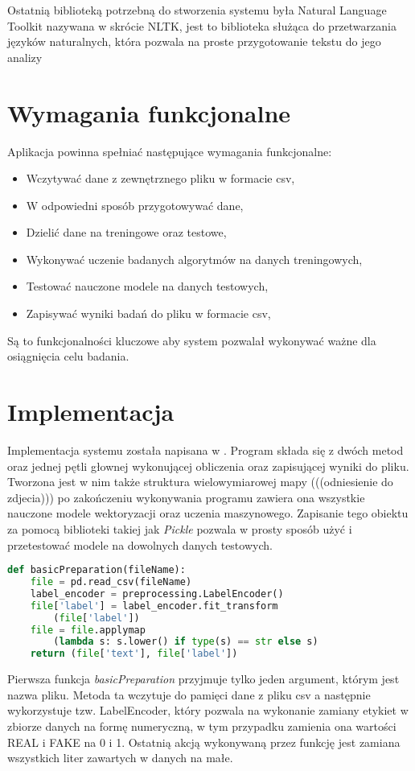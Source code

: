 Ostatnią biblioteką potrzebną do stworzenia systemu była Natural Language Toolkit nazywana w skrócie 
NLTK, jest to biblioteka służąca do przetwarzania języków naturalnych, która pozwala na proste przygotowanie tekstu do jego analizy
\section{Wymagania funkcjonalne}
Aplikacja powinna spełniać następujące wymagania funkcjonalne: 
\begin{itemize}
    \item Wczytywać dane z zewnętrznego pliku w formacie csv,
    \item W odpowiedni sposób przygotowywać dane,
    \item Dzielić dane na treningowe oraz testowe,
    \item Wykonywać uczenie badanych algorytmów na danych treningowych,
    \item Testować nauczone modele na danych testowych,
    \item Zapisywać wyniki badań do pliku w formacie csv,
\end{itemize}
Są to funkcjonalności kluczowe aby system pozwalał wykonywać ważne dla osiągnięcia celu
badania. 
\section{Implementacja}
Implementacja systemu została napisana w . Program składa się z dwóch metod oraz jednej pętli
głownej wykonującej obliczenia oraz zapisującej wyniki do pliku. Tworzona jest w nim także struktura
wielowymiarowej mapy (((odniesienie do zdjecia))) po zakończeniu wykonywania programu zawiera ona
wszystkie nauczone modele wektoryzacji oraz uczenia maszynowego. Zapisanie tego obiektu za pomocą
biblioteki takiej jak \textit{Pickle} pozwala
w prosty sposób użyć i przetestować modele na dowolnych danych testowych. 

\begin{lstlisting}[language=Python, caption={Funkcja przygotowywująca dane pobrane z pliku csv}, captionpos=b, frame=single]
def basicPreparation(fileName): 
    file = pd.read_csv(fileName)
    label_encoder = preprocessing.LabelEncoder()
    file['label'] = label_encoder.fit_transform
        (file['label']) 
    file = file.applymap
        (lambda s: s.lower() if type(s) == str else s) 
    return (file['text'], file['label'])
\end{lstlisting}
Pierwsza funkcja \textit{basicPreparation} przyjmuje tylko jeden argument, którym jest
nazwa pliku. Metoda ta wczytuje do pamięci dane z pliku csv a następnie wykorzystuje
tzw. LabelEncoder, który pozwala na wykonanie zamiany etykiet w zbiorze danych na formę
numeryczną, w tym przypadku zamienia ona wartości REAL i FAKE na 0 i 1. Ostatnią 
akcją wykonywaną przez funkcję jest zamiana wszystkich liter zawartych w danych na małe.

